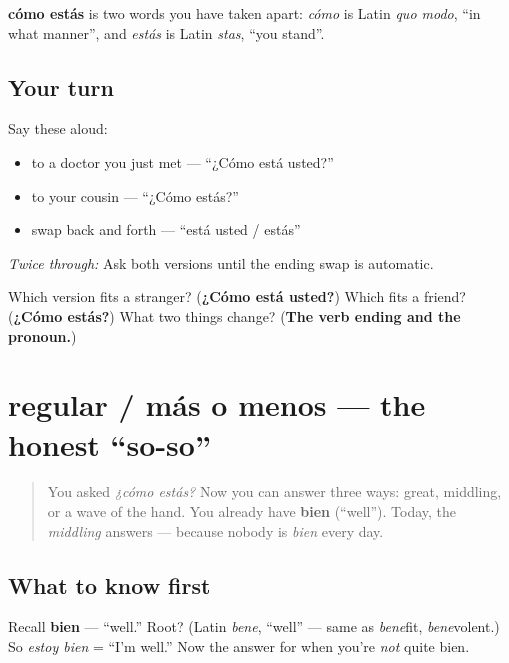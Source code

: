 \begin{cousinweb}
\textbf{cómo estás} is two words you have taken apart: \emph{cómo} is Latin \emph{quo modo}, \textquotedblleft{}in what manner\textquotedblright{}, and \emph{estás} is Latin \emph{stas}, \textquotedblleft{}you stand\textquotedblright{}.
\end{cousinweb}

\subsection*{Your turn}
Say these aloud:

\begin{itemize}
\raggedright
  \item to a doctor you just met — \textquotedblleft{}¿Cómo está usted?\textquotedblright{}
  \item to your cousin — \textquotedblleft{}¿Cómo estás?\textquotedblright{}
  \item swap back and forth — \textquotedblleft{}está usted / estás\textquotedblright{}
\end{itemize}

\emph{Twice through:} Ask both versions until the ending swap is automatic.

\begin{tcolorbox}[breakable,colback=teal!4,colframe=teal!35!black,title={Before you move on}]
Which version fits a stranger? (\textbf{¿Cómo está usted?}) Which fits a friend? (\textbf{¿Cómo estás?}) What two things change? (\textbf{The verb ending and the pronoun.})
\end{tcolorbox}
\section[regular]{regular / más o menos — the honest \textquotedblleft{}so-so\textquotedblright{}}

\label{lesson:ES-C04-regular}



\begin{quote}
You asked \emph{¿cómo estás?} Now you can answer three ways: great, middling, or a wave of the hand. You already have \textbf{bien} (\textquotedblleft{}well\textquotedblright{}). Today, the \emph{middling} answers — because nobody is \emph{bien} every day.
\end{quote}

\subsection*{What to know first}
Recall \textbf{bien} — \textquotedblleft{}well.\textquotedblright{} Root? (Latin \emph{bene}, \textquotedblleft{}well\textquotedblright{} — same as \emph{bene}fit, \emph{bene}volent.) So \emph{estoy bien} = \textquotedblleft{}I'm well.\textquotedblright{} Now the answer for when you're \emph{not} quite bien.

